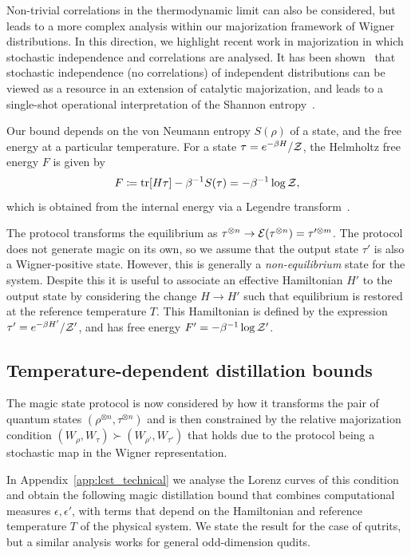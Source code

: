 \documentclass[pra,
aps,
twocolumn,
superscriptaddress,
groupedaddress,
nofootinbib,
reprint
]{revtex4-1}
\begin{document}
Non-trivial correlations in the thermodynamic limit can also be considered, but leads to a more complex analysis within our majorization framework of Wigner distributions. In this direction, we highlight recent work in majorization in which stochastic independence and correlations are analysed. It has been shown~\cite{muller_2015} that stochastic independence (no correlations) of independent distributions can be viewed as a resource in an extension of catalytic majorization, and leads to a single-shot operational interpretation of the Shannon entropy~\cite{muller_2016, muller_2019}.

Our bound depends on the von Neumann entropy $S(\rho)$ of a state, and the free energy at a particular temperature.
For a state $\tau = e^{-\beta H}/\mathcal{Z}$, the Helmholtz free energy $F$ is given by
\begin{equation}
	F \coloneqq \mbox{tr}[H \tau] - \beta^{-1}S(\tau) = -\beta^{-1}\log \mathcal{Z},
\end{equation}
which is obtained from the internal energy via a Legendre transform~\cite{Pathria_1997}.

The protocol transforms the equilibrium as $\tau^{\otimes n} \rightarrow {\mathcal E}(\tau^{\otimes n}) = \tau^{\prime \otimes m}$.  The protocol does not generate magic on its own, so we assume that the output state $\tau'$ is also a Wigner-positive state. However, this is generally a \emph{non-equilibrium} state for the system. Despite this it is useful to associate an effective Hamiltonian $H'$ to the output state by considering the change $H \rightarrow H'$ such that equilibrium is restored at the reference temperature $T$. This Hamiltonian is defined by the expression $\tau' = e^{-\beta H'}/\mathcal{Z}'$, and has free energy $F' = -\beta^{-1} \log \mathcal{Z}'$. 

\subsection{Temperature-dependent distillation bounds}

The magic state protocol is now considered by how it transforms the pair of quantum states $(\rho^{\otimes n}, \tau^{\otimes n})$ and is then constrained by the relative majorization condition $(W_{\rho}, W_\tau) \succ (W_{\rho'}, W_{\tau'})$ that holds due to the protocol being a stochastic map in the Wigner representation.

In Appendix~\ref{app:lcst_technical} we analyse the Lorenz curves of this condition and obtain the following magic distillation bound that combines computational measures $\epsilon,\epsilon'$, with terms that depend on the Hamiltonian and reference temperature $T$ of the physical system. We state the result for the case of qutrits, but a similar analysis works for general odd-dimension qudits.
\end{document}
